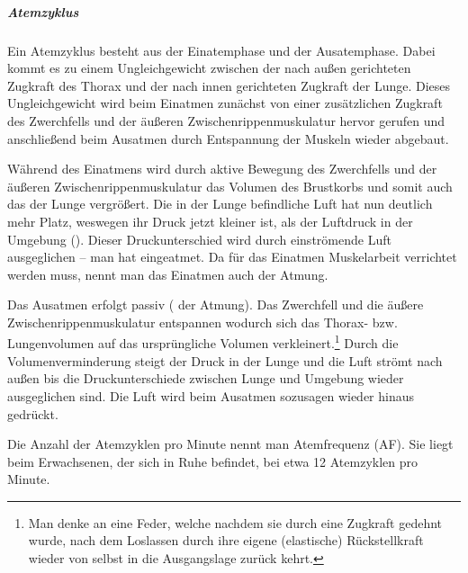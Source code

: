{\subparagraph{Atemzyklus}
Ein Atemzyklus besteht aus der Einatemphase und der
Ausatemphase. Dabei kommt es zu einem
Ungleichgewicht zwischen der nach außen gerichteten Zugkraft des Thorax und
der nach innen gerichteten Zugkraft der Lunge. Dieses
Ungleichgewicht wird beim Einatmen zunächst von einer
zusätzlichen Zugkraft des Zwerchfells und der äußeren Zwischenrippenmuskulatur hervor
gerufen und anschließend beim Ausatmen durch Entspannung der
Muskeln wieder abgebaut.

Während des
Einatmens wird durch aktive Bewegung des Zwerchfells und der
äußeren Zwischenrippenmuskulatur das Volumen des Brustkorbs
und somit auch das der Lunge vergrößert. Die in der Lunge
befindliche Luft hat nun deutlich mehr Platz, weswegen ihr Druck jetzt
kleiner ist, als der Luftdruck in der Umgebung
(). Dieser Druckunterschied wird durch
einströmende Luft ausgeglichen -- man hat eingeatmet. 
Da für das Einatmen Muskelarbeit
verrichtet werden muss, nennt man das Einatmen auch
 der Atmung.

Das Ausatmen erfolgt passiv ( der Atmung).
Das Zwerchfell und die äußere Zwischenrippenmuskulatur
entspannen wodurch sich das Thorax- bzw.
Lungenvolumen auf das ursprüngliche Volumen
verkleinert.\footnote{Man denke an eine Feder, welche
nachdem sie durch eine Zugkraft gedehnt wurde, nach dem
Loslassen durch ihre eigene (elastische) Rückstellkraft
wieder von selbst in die Ausgangslage zurück kehrt.} Durch die Volumenverminderung steigt der Druck in
der Lunge und die Luft strömt nach außen bis die
Druckunterschiede zwischen Lunge und Umgebung wieder
ausgeglichen sind. Die Luft wird beim Ausatmen sozusagen
wieder hinaus gedrückt.

Die Anzahl der Atemzyklen pro Minute nennt man Atemfrequenz
(AF). Sie liegt beim Erwachsenen, der sich in Ruhe befindet,
bei etwa 12 Atemzyklen pro Minute.

% 
}
